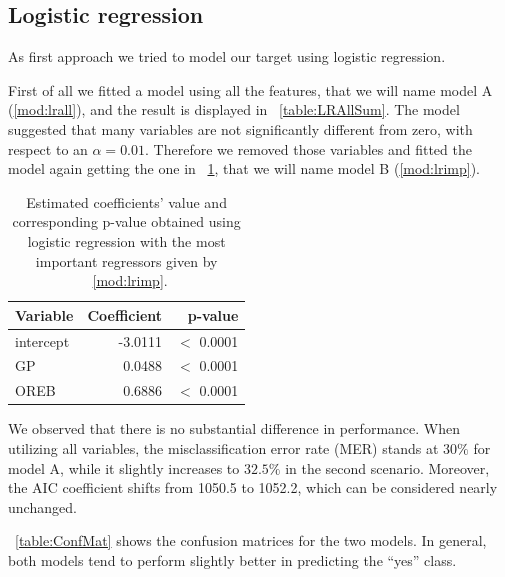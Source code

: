 \subsection{Logistic regression}\label{appendix:lr}

As first approach we tried to model our target using logistic regression.

First of all we fitted a model using all the features, that we will name model A (\ref{mod:lrall}), and the result is displayed in \Tab~\ref{table:LRAllSum}. The model suggested that many variables are not significantly different from zero, with respect to an $\alpha = 0.01$. Therefore we removed those variables and fitted the model again getting the one in \Tab~\ref{table:LRImpSum}, that we will name model B (\ref{mod:lrimp}).

\begin{center}
\end{center}

\begin{table}[H]
	\centering
	\begin{tabular}{|| l | r | r ||} 
		\hline
		Variable & Coefficient & p-value \\
		\hline
		intercept & -3.0111 & $<$ 0.0001 \\
		GP & 0.0488 & $<$ 0.0001 \\
		OREB & 0.6886 & $<$ 0.0001 \\	
		\hline
	\end{tabular}
	\caption{Estimated coefficients' value and corresponding p-value obtained using logistic regression with the most important regressors given by \Mod~\ref{mod:lrimp}.}
	\label{table:LRImpSum}
\end{table}

We observed that there is no substantial difference in performance. When utilizing all variables, the misclassification error rate (MER) stands at $30\%$ for model A, while it slightly increases to $32.5\%$ in the second scenario. Moreover, the AIC coefficient shifts from 1050.5 to 1052.2, which can be considered nearly unchanged.

\Tab~\ref{table:ConfMat} shows the confusion matrices for the two models. In general, both models tend to perform slightly better in predicting the ``yes'' class.

